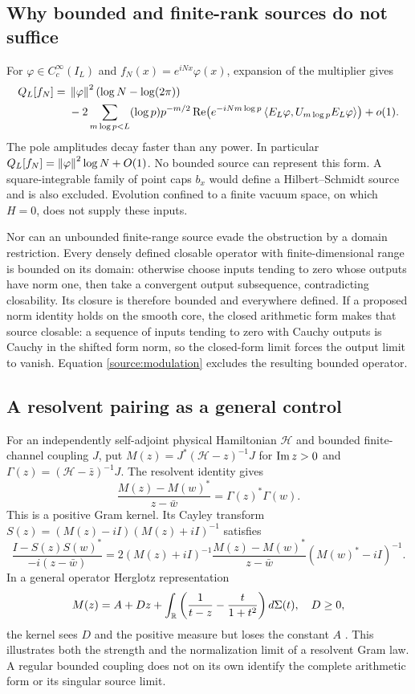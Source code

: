 \subsection{Why bounded and finite-rank sources do not suffice}
For $\varphi\in C_c^\infty(I_L)$ and
$f_N(x)=e^{iNx}\varphi(x)$, expansion of the multiplier gives
\begin{equation}\label{source:modulation}
\begin{split}
Q_L[f_N]={}&\left\lVert\varphi\right\rVert^2(\log N-\log(2\pi))\\
&-2\sum_{m\log p<L}(\log p)p^{-m/2}
\operatorname{Re}\!\left(e^{-iNm\log p}
\left\langle E_L\varphi,U_{m\log p}E_L\varphi\right\rangle\right)+o(1).
\end{split}
\end{equation}
The pole amplitudes decay faster than any power. In particular
$Q_L[f_N]=\left\lVert\varphi\right\rVert^2\log N+O(1)$. No bounded source can
represent this form. A square-integrable family of point caps
$b_x$ would define a Hilbert--Schmidt source and is also excluded.
Evolution confined to a finite vacuum space, on which $H=0$,
does not supply these inputs.

Nor can an unbounded finite-range source evade the obstruction by
a domain restriction. Every densely defined closable operator
with finite-dimensional range is bounded on its domain: otherwise
choose inputs tending to zero whose outputs have norm one, then
take a convergent output subsequence, contradicting closability.
Its closure is therefore bounded and everywhere defined.
If a proposed norm identity holds on the smooth core, the closed
arithmetic form makes that source closable: a sequence of inputs
tending to zero with Cauchy outputs is Cauchy in the shifted form
norm, so the closed-form limit forces the output limit to vanish.
Equation \eqref{source:modulation} excludes the resulting bounded
operator.

\subsection{A resolvent pairing as a general control}
For an independently self-adjoint physical Hamiltonian $\mathcal H$
and bounded finite-channel coupling $J$, put
$M(z)=J^*(\mathcal H-z)^{-1}J$ for $\operatorname{Im} z>0$ and
$\Gamma(z)=(\mathcal H-\bar z)^{-1}J$. The resolvent identity gives
\begin{equation}\label{source:nevanlinna}
\frac{M(z)-M(w)^*}{z-\bar w}=\Gamma(z)^*\Gamma(w).
\end{equation}
This is a positive Gram kernel. Its Cayley transform
$S(z)=(M(z)-iI)(M(z)+iI)^{-1}$ satisfies
\[
\frac{I-S(z)S(w)^*}{-i(z-\bar w)}
=2(M(z)+iI)^{-1}
 \frac{M(z)-M(w)^*}{z-\bar w}(M(w)^*-iI)^{-1}.
\]
In a general operator Herglotz representation
\[
M(z)=A+Dz+\int_\mathbb R
 \left(\frac1{t-z}-\frac{t}{1+t^2}\right)d\Sigma(t),
\quad D\ge0,
\]
the kernel sees $D$ and the positive measure but loses the constant
$A$ \cite{Herglotz}. This illustrates both the strength and the
normalization limit of a resolvent Gram law. A regular bounded
coupling does not on its own identify the complete arithmetic form
or its singular source limit.

